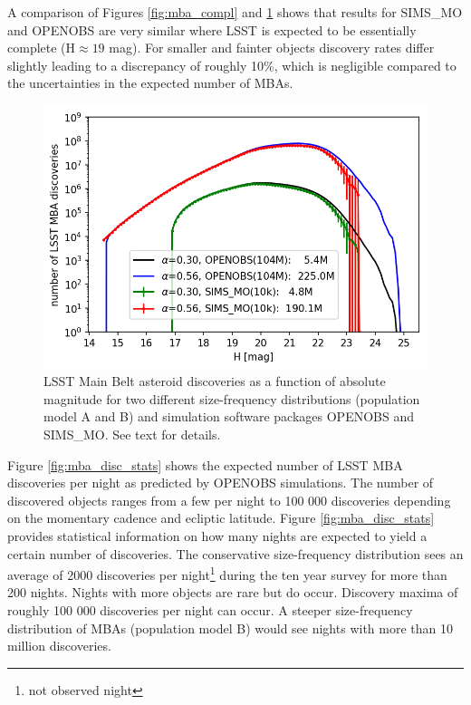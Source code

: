 A comparison of Figures \ref{fig:mba_compl} and \ref{fig:mba_disc} shows that results for SIMS\_MO and OPENOBS are very similar where \gls{LSST} is expected to be essentially complete (H$\approx19$ mag). For smaller and fainter objects discovery rates differ slightly leading to a discrepancy of roughly 10\%, which is negligible compared to the uncertainties in the expected number of MBAs. 
%
\begin{figure}[tb!]
\begin{center}
\includegraphics[scale=0.9]{figs/mba_disc3.png}
\end{center}
\caption{LSST Main Belt asteroid discoveries as a function of absolute magnitude for two different size-frequency distributions (population model A and \gls{B}) and simulation software packages OPENOBS and SIMS\_MO. See text for details.}
\label{fig:mba_disc}       %
\end{figure}
%
Figure \ref{fig:mba_disc_stats} shows the expected number of \gls{LSST} \gls{MBA} discoveries per night as predicted by OPENOBS simulations. The number of discovered objects ranges from a few per night to 100 000 discoveries depending on the momentary cadence and ecliptic latitude. Figure \ref{fig:mba_disc_stats} provides statistical information on how many nights are expected to yield a certain number of discoveries. The conservative size-frequency distribution sees an average of 2000 discoveries per night\footnote{not observed night} during the ten year survey for more than 200 nights. Nights with more objects are rare but do occur. Discovery maxima of roughly 100 000 discoveries per night can occur. A steeper size-frequency distribution of MBAs (population model \gls{B}) would see nights with more than 10 million discoveries. 

